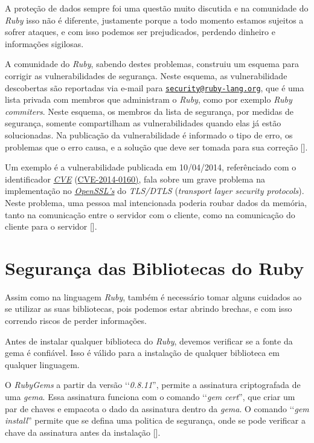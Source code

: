 A proteção de dados sempre foi uma questão muito discutida e na comunidade do \emph{Ruby} isso não é
diferente, justamente porque a todo momento estamos sujeitos a sofrer ataques, e com isso podemos ser
prejudicados, perdendo dinheiro e informações sigilosas.

A comunidade do \emph{Ruby}, sabendo destes problemas, construiu um esquema para corrigir as
vulnerabilidades de segurança. Neste esquema, as vulnerabilidade descobertas são reportadas via e-mail para
\href{mailto:security@ruby-lang.org}{\nolinkurl{security@ruby-lang.org}}, que é uma lista privada com
membros que administram o \emph{Ruby}, como por exemplo \emph{Ruby commiters}. Neste esquema, os membros da
lista de segurança, por medidas de segurança, somente compartilham as vulnerabilidades quando elas já estão
solucionadas. Na publicação da vulnerabilidade é informado o tipo de erro, os problemas que o erro causa,
e a solução que deve ser tomada para sua correção [].

Um exemplo é a vulnerabilidade publicada em 10/04/2014, referênciado com o identificador
\emph{\href{https://cve.mitre.org/}{CVE}}
(\href{https://web.nvd.nist.gov/view/vuln/detail?vulnId=CVE-2014-0160}{CVE-2014-0160)}, fala sobre um grave
problema na implementação no \emph{\href{https://www.openssl.org}{OpenSSL’s}} do \emph{TLS/DTLS} (\emph{transport
layer security protocols}). Neste problema, uma pessoa mal intencionada poderia roubar dados da memória, tanto
na comunicação entre o servidor com o cliente, como na comunicação do cliente para o servidor
[].

\section{Segurança das Bibliotecas do Ruby}
\label{section:segurança_das_bibliotecas_do_ruby}

Assim como na linguagem \emph{Ruby}, também é necessário tomar alguns cuidados ao se utilizar as suas
bibliotecas, pois podemos estar abrindo brechas, e com isso correndo riscos de perder informações.

Antes de instalar qualquer biblioteca do \emph{Ruby}, devemos verificar se a fonte da gema é
confiável. Isso é válido para a instalação de qualquer biblioteca em qualquer linguagem.

O \emph{RubyGems} a partir da versão ‘‘\emph{0.8.11}'', permite a assinatura criptografada de uma \emph{gema}.
Essa assinatura funciona com o comando ‘‘\emph{gem cert}'', que criar um par de chaves e empacota o dado da
assinatura dentro da \emph{gema}. O comando ‘‘\emph{gem install}'' permite que se defina uma politica de
segurança, onde se pode verificar a chave da assinatura antes da instalação [].

